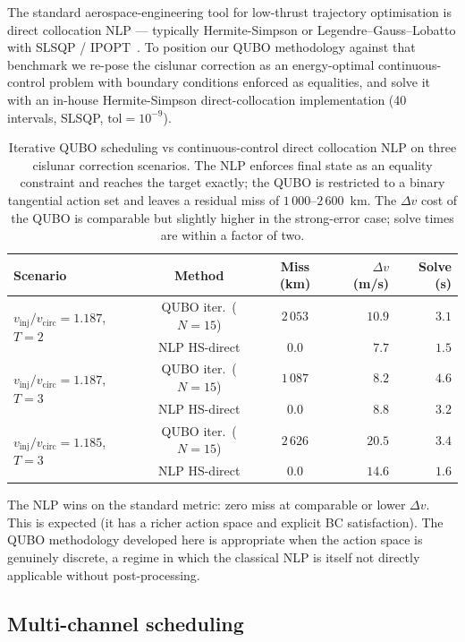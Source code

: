 \documentclass[11pt,a4paper]{article}
\theoremstyle{plain}
\begin{document}
The standard aerospace-engineering tool for low-thrust trajectory
optimisation is direct collocation NLP --- typically Hermite-Simpson
or Legendre--Gauss--Lobatto with SLSQP /
IPOPT~\cite{Kelly2017,Betts2010}. To position our
QUBO methodology against that benchmark we re-pose the cislunar
correction as an energy-optimal continuous-control problem with
boundary conditions enforced as equalities, and solve it with an
in-house Hermite-Simpson direct-collocation implementation
(40 intervals, SLSQP, $\mathrm{tol} = 10^{-9}$).

\begin{table}[htbp]
\centering
\begin{tabular}{lccrr}
\toprule
Scenario & Method & Miss (km) & $\Delta v$ (m/s) & Solve (s) \\
\midrule
\multirow{2}{*}{$v_\mathrm{inj}/v_\mathrm{circ}=1.187$, $T=2$}
  & QUBO iter.\ ($N{=}15$) & $2\,053$ & $10.9$ & $3.1$ \\
  & NLP HS-direct & $0.0$ & $7.7$ & $1.5$ \\
\multirow{2}{*}{$v_\mathrm{inj}/v_\mathrm{circ}=1.187$, $T=3$}
  & QUBO iter.\ ($N{=}15$) & $1\,087$ & $8.2$ & $4.6$ \\
  & NLP HS-direct & $0.0$ & $8.8$ & $3.2$ \\
\multirow{2}{*}{$v_\mathrm{inj}/v_\mathrm{circ}=1.185$, $T=3$}
  & QUBO iter.\ ($N{=}15$) & $2\,626$ & $20.5$ & $3.4$ \\
  & NLP HS-direct & $0.0$ & $14.6$ & $1.6$ \\
\bottomrule
\end{tabular}
\caption{Iterative QUBO scheduling vs continuous-control direct
collocation NLP on three cislunar correction scenarios. The NLP
enforces final state as an equality constraint and reaches the
target exactly; the QUBO is restricted to a binary tangential
action set and leaves a residual miss of $1\,000$--$2\,600$~km.
The $\Delta v$ cost of the QUBO is comparable but slightly higher
in the strong-error case; solve times are within a factor of two.}
\label{tab:nlp-vs-qubo}
\end{table}

The NLP wins on the standard metric: zero miss at comparable or
lower $\Delta v$. This is expected (it has a richer action
space and explicit BC
satisfaction). The QUBO methodology developed here is appropriate when the
action space is genuinely discrete, a regime in which the
classical NLP is itself not directly applicable without
post-processing.

\subsection{Multi-channel scheduling}\label{sec:multi-channel}
\end{document}
